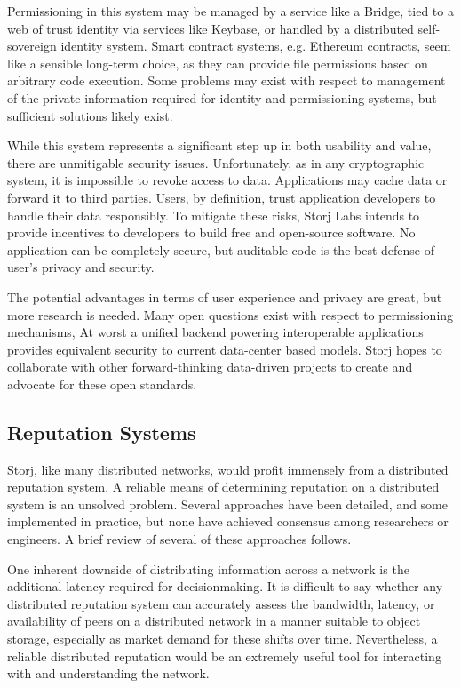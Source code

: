 \documentclass[a4paper,10pt]{article}
\begin{document}
Permissioning in this system may be managed by a service like a Bridge, tied to a web of trust identity via services like Keybase, or handled by a distributed self-sovereign identity system. Smart contract systems, e.g. Ethereum \cite{17} contracts, seem like a sensible long-term choice, as they can provide file permissions based on arbitrary code execution. Some problems may exist with respect to management of the private information required for identity and permissioning systems, but sufficient solutions likely exist.

While this system represents a significant step up in both usability and value, there are unmitigable security issues. Unfortunately, as in any cryptographic system, it is impossible to revoke access to data. Applications may cache data or forward it to third parties. Users, by definition, trust application developers to handle their data responsibly. To mitigate these risks, Storj Labs intends to provide incentives to developers to build free and open-source software. No application can be completely secure, but auditable code is the best defense of user’s privacy and security.

The potential advantages in terms of user experience and privacy are great, but more research is needed. Many open questions exist with respect to permissioning mechanisms,  At worst a unified backend powering interoperable applications provides equivalent security to current data-center based models. Storj hopes to collaborate with other forward-thinking data-driven projects to create and advocate for these open standards.

\subsection{Reputation Systems}
Storj, like many distributed networks, would profit immensely from a distributed reputation system. A reliable means of determining reputation on a distributed system is an unsolved problem. Several approaches have been detailed, and some implemented in practice, but none have achieved consensus among researchers or engineers. A brief review of several of these approaches follows.

One inherent downside of distributing information across a network is the additional latency required for decisionmaking. It is difficult to say whether any distributed reputation system can accurately assess the bandwidth, latency, or availability of peers on a distributed network in a manner suitable to object storage, especially as market demand for these shifts over time. Nevertheless, a reliable distributed reputation would be an extremely useful tool for interacting with and understanding the network.
\end{document}
